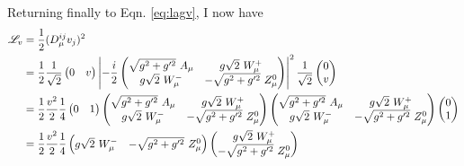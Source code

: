     Returning finally to Eqn. \ref{eq:lagv}, I now have
    \begin{equation} \begin{split}
        \label{eq:lagv_full}
        \Lag_v & = \frac{1}{2} (D_{\mu}^{ij} v_j)^2 \\
        & = \frac{1}{2}
            \frac{1}{\sqrt{2}} \begin{pmatrix} 0 & v \end{pmatrix}
            \left| -\frac{i}{2}
                \begin{pmatrix} 
                    \sqrt{g^2 + g^{\prime 2}}\ A_{\mu} & g \sqrt{2}\ W^+_{\mu} \\
                    g \sqrt{2}\ W^-_{\mu} & - \sqrt{g^2 + g^{\prime 2}}\ Z^0_{\mu}
                \end{pmatrix}
            \right|^2
            \frac{1}{\sqrt{2}} \begin{pmatrix} 0 \\ v \end{pmatrix} \\
        & = \frac{1}{2} \frac{v^2}{2} \frac{1}{4}
            \begin{pmatrix} 0 & 1 \end{pmatrix}
            \begin{pmatrix} 
                \sqrt{g^2 + g^{\prime 2}}\ A_{\mu} & g \sqrt{2}\ W^+_{\mu} \\
                g \sqrt{2}\ W^-_{\mu} & - \sqrt{g^2 + g^{\prime 2}}\ Z^0_{\mu}
            \end{pmatrix}
            \begin{pmatrix} 
                \sqrt{g^2 + g^{\prime 2}}\ A_{\mu} & g \sqrt{2}\ W^+_{\mu} \\
                g \sqrt{2}\ W^-_{\mu} & - \sqrt{g^2 + g^{\prime 2}}\ Z^0_{\mu}
            \end{pmatrix}
            \begin{pmatrix} 0 \\ 1 \end{pmatrix} \\
        & = \frac{1}{2} \frac{v^2}{2} \frac{1}{4}
            \begin{pmatrix} 
                g \sqrt{2}\ W^-_{\mu} & - \sqrt{g^2 + g^{\prime 2}}\ Z^0_{\mu}
            \end{pmatrix}
            \begin{pmatrix} 
                 g \sqrt{2}\ W^+_{\mu} \\
                 - \sqrt{g^2 + g^{\prime 2}}\ Z^0_{\mu}

\end{pmatrix}
\end{split}
\end{equation}
